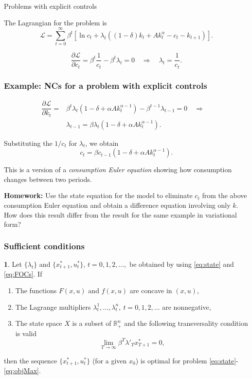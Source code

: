 \documentclass[10pt]{beamer}
\theoremstyle{definition}
\newtheorem{Fact}{\translate{Fact}}
\begin{document}
\begin{section}{Problems with explicit controls}
\begin{frame}[fragile]
The Lagrangian for the problem is \[ \mathcal{L} = \sum_{t=0}^{\infty}\beta^t \left[\ln c_t + \lambda_t ((1-\delta)k_t + Ak_t^\alpha - c_t -k_{t+1}) \right]. \]

\[ \dfrac{\partial \mathcal{L}}{\partial c_t} = \beta^t \dfrac{1}{c_t}- \beta^t \lambda_t = 0 \quad \Rightarrow \quad \lambda_t = \dfrac{1}{c_t}. \]
\end{frame}

\begin{frame}[fragile]
\frametitle{Example: NCs for a problem with explicit controls}
\[\begin{split}
\dfrac{\partial \mathcal{L}}{\partial k_t} =& \beta^t \lambda_t (1-\delta + \alpha A k_t^{\alpha-1}) - \beta^{t-1}\lambda_{t-1} = 0 \quad \Rightarrow \quad \\
&\lambda_{t-1} = \beta \lambda_t (1-\delta + \alpha A k_t^{\alpha-1}).
\end{split} \]

Substituting the $ 1/c_t $ for $ \lambda_t $, we obtain \[ c_t = \beta c_{t-1} (1-\delta + \alpha A k_t^{\alpha-1}). \]

This is a version of a \emph{consumption Euler equation} showing how consumption changes between two periods.\bigskip \pause

\textbf{Homework:} Use the state equation for the model to eliminate $ c_t $ from the above consumption Euler equation and obtain a difference equation involving only $ k $. How does this result differ from the result for the same example in variational form?
\end{frame}


\begin{frame}[fragile]
\frametitle{Sufficient conditions}
\begin{Fact} Let $\{\lambda_t\}$ and $\{x^*_{t+1},u^*_t\}$,
$t=0,1,2,\ldots,$ be obtained by using \eqref{eq:state}
and \eqref{eq:FOCs}. If 
	\begin{enumerate}
	\item The functions $F(x,u)$ and $f(x,u)$
	are concave in $(x,u)$,
	\item The Lagrange multipliers $\lambda_t^1,\ldots,\lambda_t^n,
	~t=0,1,2,\ldots$ are nonnegative,
	\item The state space $X$ is a subset of $\mathbb{R}^n_+$ and the following transversality condition is valid $$\lim_{T\rightarrow \infty} \beta^T \lambda'_T 
	x^*_{T+1}=0,$$
	\end{enumerate} 
then the sequence $\{x^*_{t+1},u^*_t\}$ (for a given $x_0$) is optimal for problem  \eqref{eq:state}-\eqref{eq:objMax}.
\label{fc:sufficiency}\end{Fact}
\end{frame}



\end{section}
\end{document}
